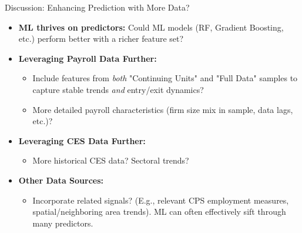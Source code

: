 \documentclass{beamer}
\begin{document}
\begin{frame}{Discussion: Enhancing Prediction with More Data?}
    \begin{itemize}
        \item \textbf{ML thrives on predictors:} Could ML models (RF, Gradient Boosting, etc.) perform better with a richer feature set?
        \item \textbf{Leveraging Payroll Data Further:}
            \begin{itemize}
                \item Include features from \textit{both} "Continuing Units" and "Full Data" samples to capture stable trends \textit{and} entry/exit dynamics?
                \item More detailed payroll characteristics (firm size mix in sample, data lags, etc.)?
            \end{itemize}
        \item \textbf{Leveraging CES Data Further:}
            \begin{itemize}
                \item More historical CES data? Sectoral trends?
            \end{itemize}
        \item \textbf{Other Data Sources:}
            \begin{itemize}
                 \item Incorporate related signals? (E.g., relevant CPS employment measures, spatial/neighboring area trends). ML can often effectively sift through many predictors.
            \end{itemize}
    \end{itemize}
\end{frame}
\end{document}

